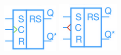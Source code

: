 \begin{figure}[h!]
    \centering
    \begin{minipage}[b]{0.4\textwidth}
        \includegraphics[width = \textwidth]{img/MSup.png}
    \end{minipage}
    \hfill
    \begin{minipage}[b]{0.4\textwidth}
        \includegraphics[width = \textwidth]{img/MSdown.png}
    \end{minipage}
\end{figure}

